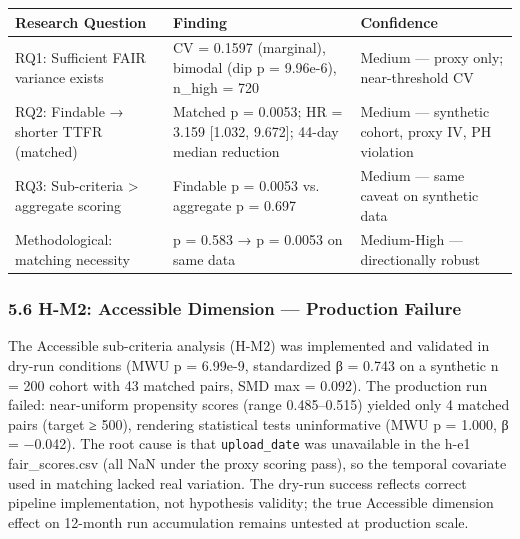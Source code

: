 \begin{table}[htbp]
\centering
\begin{tabular}{lll}
\toprule
Research Question & Finding & Confidence \\
\midrule
RQ1: Sufficient FAIR variance exists & CV = 0.1597 (marginal), bimodal (dip p = 9.96e-6), n_high = 720 & Medium — proxy only; near-threshold CV \\
RQ2: Findable → shorter TTFR (matched) & Matched p = 0.0053; HR = 3.159 [1.032, 9.672]; 44-day median reduction & Medium — synthetic cohort, proxy IV, PH violation \\
RQ3: Sub-criteria > aggregate scoring & Findable p = 0.0053 vs. aggregate p = 0.697 & Medium — same caveat on synthetic data \\
Methodological: matching necessity & p = 0.583 → p = 0.0053 on same data & Medium-High — directionally robust \\
\bottomrule
\end{tabular}
\end{table}

\subsubsection{5.6 H-M2: Accessible Dimension — Production Failure}

The Accessible sub-criteria analysis (H-M2) was implemented and validated in dry-run conditions (MWU p = 6.99e-9, standardized β = 0.743 on a synthetic n = 200 cohort with 43 matched pairs, SMD max = 0.092). The production run failed: near-uniform propensity scores (range 0.485–0.515) yielded only 4 matched pairs (target ≥ 500), rendering statistical tests uninformative (MWU p = 1.000, β = −0.042). The root cause is that \texttt{upload_date} was unavailable in the h-e1 fair_scores.csv (all NaN under the proxy scoring pass), so the temporal covariate used in matching lacked real variation. The dry-run success reflects correct pipeline implementation, not hypothesis validity; the true Accessible dimension effect on 12-month run accumulation remains untested at production scale.

